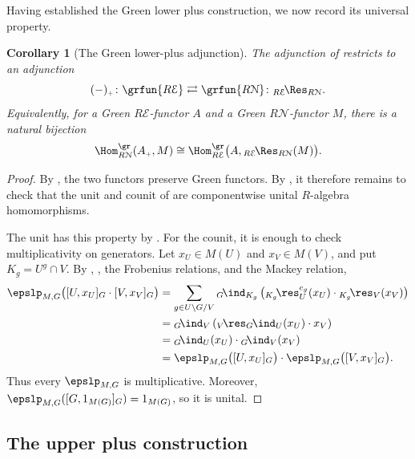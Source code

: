 \documentclass{amsart}
\numberwithin{equation}{section}%
\newtheorem{Cor}[equation]{Corollary}
\theoremstyle{remark}
\theoremstyle{definition}
\newcommand{\e}{\mathcal E}
\newcommand{\n}{\mathcal N}
\newcommand{\lind}[1]{{}_{#1}\!\ind}
\newcommand{\lres}[1]{{}_{#1}\!\res}
\newcommand{\iRes}[2]{{}_{#1}\!\Res_{#2}}
\begin{document}
%
Having established the Green lower plus construction, we now record
its universal property.
%
\begin{Cor}[The Green lower-plus adjunction]
\label{cor:lower-plus-Green-adjunction}
The adjunction of  restricts to an
adjunction
%
\[
(-)_{\scriptscriptstyle+}
\colon
\grfun{R\e}
\rightleftarrows
\grfun{R\n}
\colon
\iRes{R\e}{R\n}.
\]
%
Equivalently, for a Green $R\e$-functor $A$ and a Green
$R\n$-functor $M$, there is a natural bijection
%
\[
\Hom_{R\n}^{\gr}(\Alp,M)
\cong
\Hom_{R\e}^{\gr}
\bigl(
A,\iRes{R\e}{R\n}(M)
\bigr).
\]
%
\end{Cor}
%
\begin{proof}
By ,
the two functors preserve Green functors.
By , it therefore remains to
check that the unit and counit of
 are componentwise unital
$R$-algebra homomorphisms.

The unit has this property by
.
For the counit, it is enough to check multiplicativity on generators.
Let $x_U\in M(U)$ and $x_V\in M(V)$, and put
$K_g=U^g\cap V$. By , ,
the Frobenius relations, and the Mackey relation,
\[
\begin{aligned}
\epslp_{M,G}
\bigl([U,x_U]_G\cdot[V,x_V]_G\bigr)
&=
\sum_{g\in U\backslash G/V}
\lind{G}_{K_g}
\left(
\lres{K_g}_U^{c_g}(x_U)\cdot
\lres{K_g}_V(x_V)
\right) 
\\
&=
\lind{G}_V
\left(
\lres{V}_G\lind{}_U(x_U)\cdot x_V
\right) 
\\
&=
\lind{G}_U(x_U)\cdot\lind{G}_V(x_V) 
\\
&=\epslp_{M,G}
\bigl([U,x_U]_G\bigr) \cdot \epslp_{M,G}
\bigl([V,x_V]_G\bigr)
.
\end{aligned}
\]
Thus every $\epslp_{M,G}$ is multiplicative. Moreover,
$\epslp_{M,G}([G,1_{M(G)}]_G)=1_{M(G)}$, so it is unital.
\end{proof}


%
\subsection{The upper plus construction}\
\label{ssec:upper-plus-construction}
%
\end{document}
